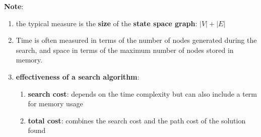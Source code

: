 \textbf{Note}:
\begin{enumerate}[itemsep=0.2cm]
    \item the typical measure is the \textbf{size} of the \textbf{state space graph}: $|V| + |E|$ 
    \hfill \cite{ai/book/Artificial-Intelligence-A-Modern-Approach/Russell-Norvig}

    \item Time is often measured in terms of the number of nodes generated during the search, and space in terms of the maximum number of nodes stored in memory.
    \hfill \cite{ai/book/Artificial-Intelligence-A-Modern-Approach/Russell-Norvig}

    \item \textbf{effectiveness of a search algorithm}:
    \begin{enumerate}[itemsep=0.2cm]
        \item \textbf{search cost}: depends on the time complexity but can also include a term for memory usage
        \hfill \cite{ai/book/Artificial-Intelligence-A-Modern-Approach/Russell-Norvig}

        \item \textbf{total cost}: combines the search cost and the path cost of the solution found
        \hfill \cite{ai/book/Artificial-Intelligence-A-Modern-Approach/Russell-Norvig}
    \end{enumerate}
\end{enumerate}







